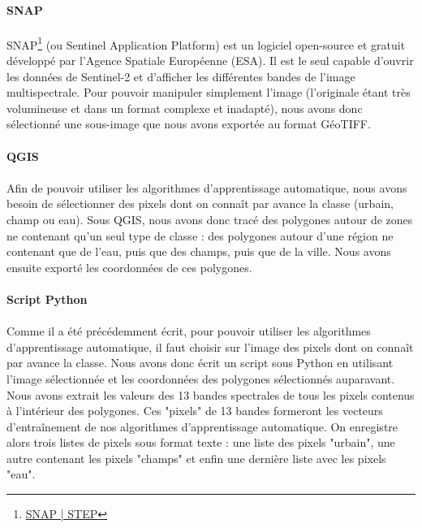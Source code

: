 \documentclass[a4paper,10pt]{article}
\begin{document}
\paragraph{SNAP}
\paragraph{}
SNAP\footnote{\href{http://step.esa.int/main/toolboxes/snap/}{SNAP | STEP}} (ou Sentinel Application Platform) est un logiciel open-source et gratuit développé par l'Agence Spatiale Européenne (ESA). Il est le seul capable d'ouvrir les données de Sentinel-2 et d'afficher les différentes bandes de l'image multispectrale. Pour pouvoir manipuler simplement l'image (l'originale étant très volumineuse et dans un format complexe et inadapté), nous avons donc sélectionné une sous-image que nous avons exportée au format GéoTIFF.
\paragraph{QGIS}
\paragraph{}
Afin de pouvoir utiliser les algorithmes d'apprentissage automatique, nous avons besoin de sélectionner des pixels dont on connaît par avance la classe (urbain, champ ou eau). Sous QGIS, nous avons donc tracé des polygones autour de zones ne contenant qu'un seul type de classe : des polygones autour d'une région ne contenant que de l'eau, puis que des champs, puis que de la ville. Nous avons ensuite exporté les coordonnées de ces polygones.
\paragraph{Script Python}
\paragraph{}
Comme il a été précédemment écrit, pour pouvoir utiliser les algorithmes d'apprentissage automatique, il faut choisir sur l'image des pixels dont on connaît par avance la classe. Nous avons donc écrit un script sous Python en utilisant l'image sélectionnée et les coordonnées des polygones sélectionnés auparavant. Nous avons extrait les valeurs des 13 bandes spectrales de tous les pixels contenus à l'intérieur des polygones. Ces "pixels" de 13 bandes formeront les vecteurs d'entraînement de nos algorithmes d'apprentissage automatique. On enregistre alors trois listes de pixels sous format texte : une liste des pixels "urbain", une autre contenant les pixels "champs" et enfin une dernière liste avec les pixels "eau".
\end{document}
